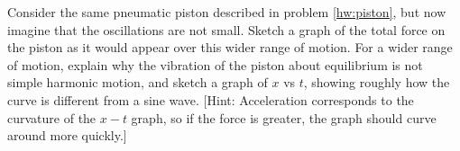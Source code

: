 Consider the same pneumatic piston described in problem \ref{hw:piston},
but now imagine that the oscillations are
not small. Sketch a graph of the total force on the piston
as it would appear over this wider range of motion. For a
wider range of motion, explain why the vibration of the
piston about equilibrium is not simple harmonic motion, and
sketch a graph of $x$ vs $t$, showing roughly how the curve
is different from a sine wave. [Hint: Acceleration
corresponds to the curvature of the $x-t$ graph, so if the
force is greater, the graph should curve around more quickly.]
